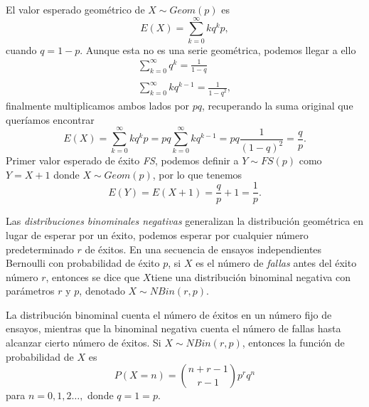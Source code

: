 \documentclass[letterpaper]{article}
\begin{document}
El valor esperado geométrico de $X\sim Geom(p)$ es
\begin{equation}
E(X)=\sum_{k=0}^{\infty}kq^kp,
\end{equation}
cuando $q=1-p$. Aunque esta no es una serie geométrica, podemos llegar a ello
\begin{equation}\begin{matrix}
\sum_{k=0}^{\infty}q^k=\frac{1}{1-q}\\
\\
\sum_{k=0}^{\infty}kq^{k-1}=\frac{1}{{1-q}^2},
\end{matrix}
\end{equation}
finalmente multiplicamos ambos lados por $pq$, recuperando la suma original que queríamos encontrar
\begin{equation}
E(X)=\sum_{k=0}^{\infty}kq^kp=pq\sum_{k=0}^{\infty}kq^{k-1}=pq\frac{1}{{(1-q)}^2}=\frac{q}{p}.
\end{equation}
Primer valor esperado de éxito \emph{FS}, podemos definir a $Y\sim FS(p)$ como $Y=X+1$ donde $X\sim Geom(p)$, por lo que tenemos
\begin{equation}
E(Y)=E(X+1)=\frac{q}{p}+1=\frac{1}{p}.
\end{equation}

Las \emph{distribuciones binominales negativas} generalizan la distribución geométrica en lugar de esperar por un éxito, podemos esperar por cualquier número predeterminado $r$ de éxitos. En una secuencia de ensayos independientes Bernoulli con probabilidad de éxito $p$, si $X$ es el número de \emph{fallas} antes del éxito número $r$, entonces se dice que $X$tiene una distribución binominal negativa con parámetros $r$ y $p$, denotado $X\sim NBin(r,p)$.

La distribución binominal cuenta el número de éxitos en un número fijo de ensayos, mientras que la binominal negativa cuenta el número de fallas hasta alcanzar cierto número de éxitos. Si $X\sim NBin(r,p)$, entonces la función de probabilidad de $X$ es
\begin{equation}
P(X=n)=\binom{n+r-1}{r-1}p^rq^n
\end{equation}
para $n=0,1,2\ldots,$ donde $q=1=p$.
\end{document}
